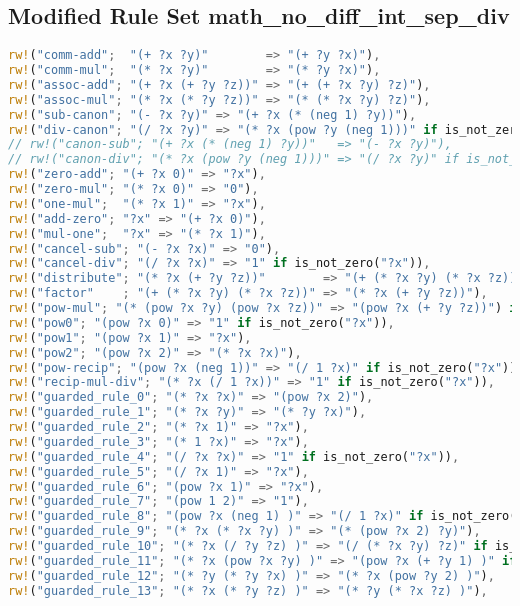 \newpage
\subsection{Modified Rule Set math\_no\_diff\_int\_sep\_div}
\label{app:no_diff_int_sep_div}
\begin{lstlisting}[language=Rust, caption={Rule set \ref{app:no_diff_int} with seperately completed rules for division.}, label={lst:no_diff_int_sep_div}]
rw!("comm-add";  "(+ ?x ?y)"        => "(+ ?y ?x)"),
rw!("comm-mul";  "(* ?x ?y)"        => "(* ?y ?x)"),
rw!("assoc-add"; "(+ ?x (+ ?y ?z))" => "(+ (+ ?x ?y) ?z)"),
rw!("assoc-mul"; "(* ?x (* ?y ?z))" => "(* (* ?x ?y) ?z)"),
rw!("sub-canon"; "(- ?x ?y)" => "(+ ?x (* (neg 1) ?y))"),
rw!("div-canon"; "(/ ?x ?y)" => "(* ?x (pow ?y (neg 1)))" if is_not_zero("?y")),
// rw!("canon-sub"; "(+ ?x (* (neg 1) ?y))"   => "(- ?x ?y)"),
// rw!("canon-div"; "(* ?x (pow ?y (neg 1)))" => "(/ ?x ?y)" if is_not_zero("?y")),
rw!("zero-add"; "(+ ?x 0)" => "?x"),
rw!("zero-mul"; "(* ?x 0)" => "0"),
rw!("one-mul";  "(* ?x 1)" => "?x"),
rw!("add-zero"; "?x" => "(+ ?x 0)"),
rw!("mul-one";  "?x" => "(* ?x 1)"),
rw!("cancel-sub"; "(- ?x ?x)" => "0"),
rw!("cancel-div"; "(/ ?x ?x)" => "1" if is_not_zero("?x")),
rw!("distribute"; "(* ?x (+ ?y ?z))"        => "(+ (* ?x ?y) (* ?x ?z))"),
rw!("factor"    ; "(+ (* ?x ?y) (* ?x ?z))" => "(* ?x (+ ?y ?z))"),
rw!("pow-mul"; "(* (pow ?x ?y) (pow ?x ?z))" => "(pow ?x (+ ?y ?z))") if is_not_zero("?x"),
rw!("pow0"; "(pow ?x 0)" => "1" if is_not_zero("?x")),
rw!("pow1"; "(pow ?x 1)" => "?x"),
rw!("pow2"; "(pow ?x 2)" => "(* ?x ?x)"),
rw!("pow-recip"; "(pow ?x (neg 1))" => "(/ 1 ?x)" if is_not_zero("?x")),
rw!("recip-mul-div"; "(* ?x (/ 1 ?x))" => "1" if is_not_zero("?x")),
rw!("guarded_rule_0"; "(* ?x ?x)" => "(pow ?x 2)"),
rw!("guarded_rule_1"; "(* ?x ?y)" => "(* ?y ?x)"),
rw!("guarded_rule_2"; "(* ?x 1)" => "?x"),
rw!("guarded_rule_3"; "(* 1 ?x)" => "?x"),
rw!("guarded_rule_4"; "(/ ?x ?x)" => "1" if is_not_zero("?x")),
rw!("guarded_rule_5"; "(/ ?x 1)" => "?x"),
rw!("guarded_rule_6"; "(pow ?x 1)" => "?x"),
rw!("guarded_rule_7"; "(pow 1 2)" => "1"),
rw!("guarded_rule_8"; "(pow ?x (neg 1) )" => "(/ 1 ?x)" if is_not_zero("?x")),
rw!("guarded_rule_9"; "(* ?x (* ?x ?y) )" => "(* (pow ?x 2) ?y)"),
rw!("guarded_rule_10"; "(* ?x (/ ?y ?z) )" => "(/ (* ?x ?y) ?z)" if is_not_zero("?z")),
rw!("guarded_rule_11"; "(* ?x (pow ?x ?y) )" => "(pow ?x (+ ?y 1) )" if is_not_zero("?x")),
rw!("guarded_rule_12"; "(* ?y (* ?y ?x) )" => "(* ?x (pow ?y 2) )"),
rw!("guarded_rule_13"; "(* ?x (* ?y ?z) )" => "(* ?y (* ?x ?z) )"),

\end{lstlisting}
